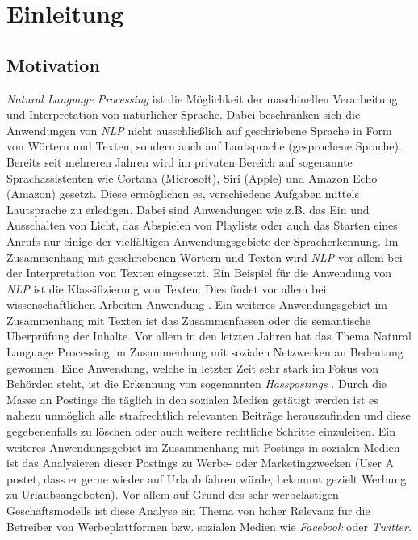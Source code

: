 \chapter{Einleitung}
\label{cha:Introduction}

\section{Motivation}
\textit{Natural Language Processing} ist die Möglichkeit der maschinellen Verarbeitung und Interpretation von natürlicher Sprache. Dabei beschränken sich die Anwendungen von \textit{NLP} nicht ausschließlich auf geschriebene Sprache in Form von Wörtern und Texten, sondern auch auf Lautsprache (gesprochene Sprache). Bereits seit mehreren Jahren wird im privaten Bereich auf sogenannte Sprachassistenten wie Cortana (Microsoft), Siri (Apple) und Amazon Echo (Amazon) gesetzt. Diese ermöglichen es, verschiedene Aufgaben mittels Lautsprache zu erledigen. Dabei sind Anwendungen wie z.B. das Ein und Ausschalten von Licht, das Abspielen von Playlists oder auch das Starten eines Anrufs nur einige der vielfältigen Anwendungsgebiete der Spracherkennung. Im Zusammenhang mit geschriebenen Wörtern und Texten wird \textit{NLP} vor allem bei der Interpretation von Texten eingesetzt. Ein Beispiel für die Anwendung von \textit{NLP} ist die Klassifizierung von Texten. Dies findet vor allem bei wissenschaftlichen Arbeiten Anwendung \cite{DannReconstructing}. Ein weiteres Anwendungsgebiet im Zusammenhang mit Texten ist das Zusammenfassen oder die semantische Überprüfung der Inhalte. Vor allem in den letzten Jahren hat das Thema Natural Language Processing im Zusammenhang mit sozialen Netzwerken an Bedeutung gewonnen. Eine Anwendung, welche in letzter Zeit sehr stark im Fokus von Behörden steht, ist die Erkennung von sogenannten \textit{Hasspostings} \cite{Nobata2016}. Durch die Masse an Postings die täglich in den sozialen Medien getätigt werden ist es nahezu unmöglich alle strafrechtlich relevanten Beiträge herauszufinden und diese gegebenenfalls zu löschen oder auch weitere rechtliche Schritte einzuleiten. Ein weiteres Anwendungsgebiet im Zusammenhang mit Postings in sozialen Medien ist das Analysieren dieser Postings zu Werbe- oder Marketingzwecken (User A postet, dass er gerne wieder auf Urlaub fahren würde, bekommt gezielt Werbung zu Urlaubsangeboten). Vor allem auf Grund des sehr werbelastigen Geschäftsmodells ist diese Analyse ein Thema von hoher Relevanz für die Betreiber von Werbeplattformen bzw. sozialen Medien wie \textit{Facebook} oder \textit{Twitter}.

